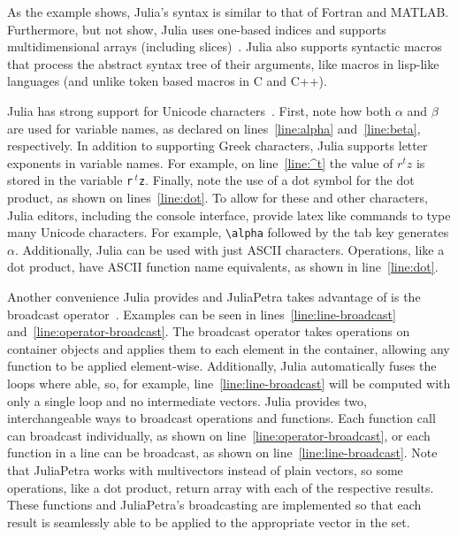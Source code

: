 \documentclass[acmsmall]{acmart}
\begin{document}
	As the example shows, Julia's syntax is similar to that of Fortran and MATLAB.
	Furthermore, but not show, Julia uses one-based indices and supports multidimensional arrays (including slices)~\cite{Bezanson:2017:FreshApproach}.
	Julia also supports syntactic macros that process the abstract syntax tree of their arguments, like macros in lisp-like languages (and unlike token based macros in C and C++).
	
	
	Julia has strong support for Unicode characters~\cite{Bezanson:2017:FreshApproach}.
	First, note how both \(\alpha\) and \(\beta\) are used for variable names, as declared on lines~\ref{line:alpha} and~\ref{line:beta}, respectively.
	In addition to supporting Greek characters, Julia supports letter exponents in variable names.
	For example, on line~\ref{line:^t} the value of \(r^tz\) is stored in the variable \texttt{r$\,^t$z}. %
	Finally, note the use of a dot symbol for the dot product, as shown on lines~\ref{line:dot}.
	To allow for these and other characters, Julia editors, including the console interface, provide latex like commands to type many Unicode characters.
	For example, \texttt{\textbackslash alpha} followed by the tab key generates \(\alpha\).
	Additionally, Julia can be used with just ASCII characters.
	Operations, like a dot product, have ASCII function name equivalents, as shown in line~\ref{line:dot}.
	
	Another convenience Julia provides and JuliaPetra takes advantage of is the broadcast operator~\cite{Bezanson:2017:FreshApproach}.
	Examples can be seen in lines~\ref{line:line-broadcast} and~\ref{line:operator-broadcast}.
	The broadcast operator takes operations on container objects and applies them to each element in the container, allowing any function to be applied element-wise.
	Additionally, Julia automatically fuses the loops where able, so, for example, line~\ref{line:line-broadcast} will be computed with only a single loop and no intermediate vectors.
	Julia provides two, interchangeable ways to broadcast operations and functions.
	Each function call can broadcast individually, as shown on line~\ref{line:operator-broadcast}, or each function in a line can be broadcast, as shown on line~\ref{line:line-broadcast}.
	Note that JuliaPetra works with multivectors instead of plain vectors, so some operations, like a dot product, return array with each of the respective results.
	These functions and JuliaPetra's broadcasting are implemented so that each result is seamlessly able to be applied to the appropriate vector in the set.
	
\end{document}
